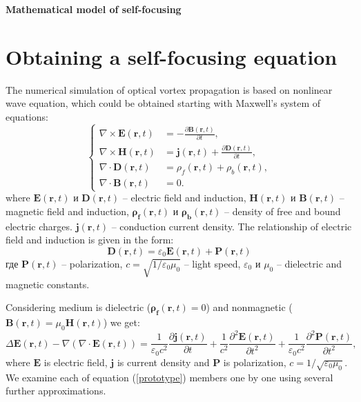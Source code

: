 \documentclass[a4paper, 12pt]{article}
\begin{document}
\begin{center}
\Huge{\textbf{Mathematical model of self-focusing}}
\end{center}

\section{Obtaining a self-focusing equation}

The numerical simulation of optical vortex propagation is based on nonlinear wave equation, which could be obtained starting with Maxwell's system of equations:
\begin{equation}
\label{eqn:maxwell}
\left\{
\begin{aligned}
\nabla \times \mathbf{E}(\mathbf{r}, t) &= -\frac{\partial \mathbf{B}(\mathbf{r}, t)}{\partial t},\\
\nabla \times \mathbf{H}(\mathbf{r}, t) &= \mathbf{j}(\mathbf{r}, t) + \frac{\partial \mathbf{D}(\mathbf{r}, t)}{\partial t},\\[0.2cm]
\nabla \cdot \mathbf{D}(\mathbf{r}, t) &= \rho_f (\mathbf{r}, t) + \rho_b (\mathbf{r}, t), \\[0.3cm]
\nabla \cdot \mathbf{B}(\mathbf{r}, t) &= 0.
\end{aligned}
\right.
\end{equation}
where $\mathbf{E}(\mathbf{r}, t)$ и $\mathbf{D}(\mathbf{r}, t)$ -- electric field and induction, $\mathbf{H}(\mathbf{r}, t)$ и $\mathbf{B}(\mathbf{r}, t)$ -- magnetic field and induction, $\mathbf{\rho_f}(\mathbf{r}, t)$ и $\mathbf{\rho_b}(\mathbf{r}, t)$ -- density of free and bound electric charges. $\mathbf{j}(\mathbf{r}, t)$ -- conduction current density. The relationship of electric field and induction is given in the form:
\begin{equation}
\label{eqn:D}
\mathbf{D}(\mathbf{r}, t) = \varepsilon_0 \mathbf{E}(\mathbf{r}, t) + \mathbf{P}(\mathbf{r}, t)
\end{equation}
где $\mathbf{P}(\mathbf{r}, t)$ -- polarization, $c = \sqrt{1 / \varepsilon_0 \mu_0}$ -- light speed, $\varepsilon_0$ и $\mu_0$ -- dielectric and magnetic constants.

Considering medium is dielectric ($\mathbf{\rho_f}(\mathbf{r}, t) = 0$) and nonmagnetic ($\mathbf{B}(\mathbf{r}, t) = \mu_0 \mathbf{H}(\mathbf{r}, t)$) 
we get:
\begin{equation}
\label{prototype}
\Delta \mathbf{E}(\mathbf{r}, t) - \nabla (\nabla \cdot \mathbf{E}(\mathbf{r}, t)) =  \frac1{\varepsilon_0 c^2} \frac{\partial \mathbf{j}(\mathbf{r}, t)}{\partial t} + \frac1{c^2} \frac{\partial^2 \mathbf{E}(\mathbf{r}, t)}{\partial t^2} + \frac1{\varepsilon_0 c^2} \frac{\partial^2 \mathbf{P}(\mathbf{r}, t)}{\partial t^2},
\end{equation}
where $\mathbf{E}$ is electric field, $\mathbf{j}$ is current density and $\mathbf{P}$ is polarization, $c=1/\sqrt{\varepsilon_0 \mu_0}$. We examine each of equation (\ref{prototype}) members one by one using several further approximations. 
\end{document}
